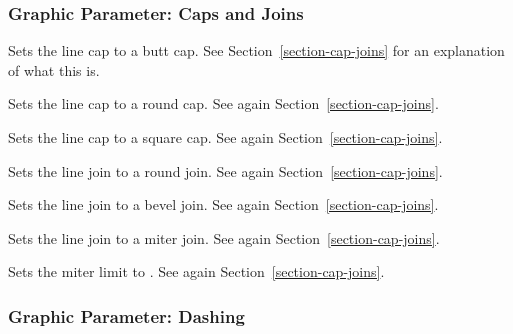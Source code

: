 \subsubsection{Graphic Parameter: Caps and Joins}

\begin{command}{\pgfsetbuttcap}
  Sets the line cap to a butt cap. See Section~\ref{section-cap-joins}
  for an explanation of what this is.
\end{command}
\begin{command}{\pgfsetroundcap}
  Sets the line cap to a round cap. See again
  Section~\ref{section-cap-joins}.
\end{command}
\begin{command}{\pgfsetrectcap}
  Sets the line cap to a square cap. See again
  Section~\ref{section-cap-joins}.
\end{command}
\begin{command}{\pgfsetroundjoin}
  Sets the line join to a round join. See again
  Section~\ref{section-cap-joins}.
\end{command}
\begin{command}{\pgfsetbeveljoin}
  Sets the line join to a bevel join. See again
  Section~\ref{section-cap-joins}.
\end{command}
\begin{command}{\pgfsetmiterjoin}
  Sets the line join to a miter join. See again
  Section~\ref{section-cap-joins}.
\end{command}
\begin{command}{\pgfsetmiterlimit{}}
  Sets the miter limit to  . See again
  Section~\ref{section-cap-joins}.
\end{command}

\subsubsection{Graphic Parameter: Dashing}

